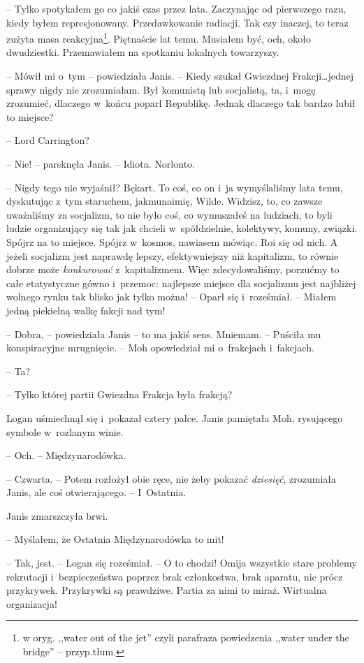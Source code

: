 \documentclass[oneside,polish,11pt,sfheadings]{mwbk}
\begin{document}
-- Tylko spotykałem go co jakiś czas przez lata. Zaczynając od pierwszego
razu, kiedy byłem represjonowany. Przedawkowanie radiacji. Tak czy
inaczej, to teraz zużyta masa reakcyjna\footnote{w oryg. ,,water out of the
jet'' czyli parafraza powiedzenia ,,water under the bridge'' -- przyp.tłum.}. 
Piętnaście lat temu. Musiałem być, och, około dwudziestki. Przemawiałem
na spotkaniu lokalnych towarzyszy.

-- Mówił mi o~tym -- powiedziała Janis. -- Kiedy szukał Gwiezdnej
Frakcji\ldots jednej sprawy nigdy nie zrozumiałam. Był komunistą lub
socjalistą, ta, i~mogę zrozumieć, dlaczego w~końcu poparł Republikę.
Jednak dlaczego tak bardzo lubił to miejsce?

-- Lord Carrington?

-- Nie! -- parsknęła Janis. -- Idiota. Norlonto.

-- Nigdy tego nie wyjaśnił? Bękart. To coś, co on i~ja wymyślaliśmy lata
temu, dyskutując z~tym staruchem, jakmunaimię, Wilde. Widzisz, to, co
zawsze uważaliśmy za socjalizm, to nie było coś, co wymuszałeś na
ludziach, to byli ludzie organizujący się tak jak chcieli w~spółdzielnie, kolektywy, komuny, związki. Spójrz na to miejsce. Spójrz w~kosmos, nawiasem mówiąc. Roi się od nich. A jeżeli socjalizm jest
naprawdę lepszy, efektywniejszy niż kapitalizm, to równie dobrze może
\emph{konkurować} z~kapitalizmem. Więc zdecydowaliśmy, porzućmy to całe
etatystyczne gówno i~przemoc: najlepsze miejsce dla socjalizmu jest
najbliżej wolnego rynku tak blisko jak tylko można! -- Oparł się i~roześmiał. -- Miałem jedną piekielną walkę fakcji nad tym!

-- Dobra, -- powiedziała Janis -- to ma jakiś sens. Mniemam. -- Puściła mu
konspiracyjne mrugnięcie. -- Moh opowiedział mi o~frakcjach i~fakcjach.

-- Ta?

-- Tylko której partii Gwiezdna Frakcja była frakcją?

Logan uśmiechnął się i~pokazał cztery palce. Janis pamiętała Moh,
rysującego symbole w~rozlanym winie.

-- Och. -- Międzynarodówka.

-- Czwarta. -- Potem rozłożył obie ręce, nie żeby pokazać \emph{dziesięć},
zrozumiała Janis, ale coś otwierającego. -- I~Ostatnia.

Janis zmarszczyła brwi. 

-- Myślałem, że Ostatnia Międzynarodówka to mit!

-- Tak, jest. -- Logan się roześmiał. -- O to chodzi! Omija wszystkie stare
problemy rekrutacji i~bezpieczeństwa poprzez brak członkostwa, brak
aparatu, nic prócz przykrywek. Przykrywki są prawdziwe. Partia za nimi
to miraż. Wirtualna organizacja!
\end{document}
